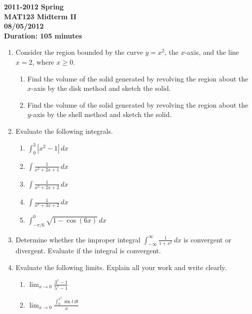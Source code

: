 \documentclass[a4paper, 12pt]{article}
\begin{document}
\pagestyle{empty}

\begin{center}
\textbf{2011-2012 Spring \\MAT123 Midterm II\\08/05/2012\\Duration: 105 minutes}
\end{center}

\begin{enumerate}[leftmargin=*,label=\textbf{\arabic*.}]
\item Consider the region bounded by the curve $y=x^2$, the $x$-axis, and the line $x=2$, where $x\geq0$.

\begin{enumerate}[leftmargin=*,label=\textbf{\alph*.}]
\item Find the volume of the solid generated by revolving the region about the $x$-axis by the disk method and sketch the solid.
\item Find the volume of the solid generated by revolving the region about the $y$-axis by the shell method and sketch the solid.
\end{enumerate}

\item Evaluate the following integrals.

\begin{enumerate}[leftmargin=*,label=\textbf{\alph*.}]
\item $\displaystyle \int_0^3\left|x^2-1\right|\, dx$
\item $\displaystyle\int\frac1{x^2+2x+1}\,dx$
\item $\displaystyle\int\frac1{x^2+2x+2}\,dx$
\item $\displaystyle\int\frac1{x^2+3x+2}\,dx$
\item $\displaystyle\int_{-\pi/6}^0\sqrt{1-\cos(6x)}\,dx$
\end{enumerate}

\item Determine whether the improper integral $\displaystyle\int_{-\infty}^\infty\frac1{1+x^2}\,dx$ is convergent or divergent. Evaluate if the integral is convergent.

\item Evaluate the following limits. Explain all your work and write clearly.

\begin{enumerate}[leftmargin=*,label=\textbf{\alph*.}]
\item $\displaystyle\lim_{x\to0}\frac{3^x-1}{5^x-1}$
\item $\displaystyle \lim_{x\to0}\frac{\displaystyle\int_0^{x^2}\sin t\,dt}x$
\end{enumerate}


\end{enumerate}
\end{document}

